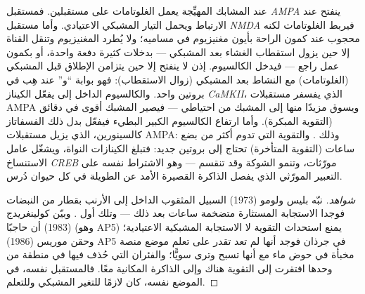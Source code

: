 \begin{proposition}\label{prop:b3:learning-memory:nmda}
عند المشابك المهيِّجة يعمل الغلوتامات على مستقبلين. فمستقبل
\emph{AMPA} ينفتح عند الارتباط ويحمل التيار المشبكي
الاعتيادي. وأما مستقبل \emph{NMDA} فيربط الغلوتامات لكنه
محجوب عند كمون الراحة بأيون مغنيزيوم في مساميه؛ ولا يُطرد
المغنيزيوم وتنقل القناة إلا حين يزول استقطاب الغشاء بعد
المشبكي --- بدخلات كثيرة دفعة واحدة، أو بكمون عمل راجع ---
فيدخل الكالسيوم.  إذن لا ينفتح إلا حين يتزامن
الإطلاق قبل المشبكي (الغلوتامات) مع النشاط بعد المشبكي
(زوال الاستقطاب): فهو بوابة ``و'' عند هِب في بروتين واحد.
والكالسيوم الداخل إلى \emph{} يفعّل الكيناز
\emph{CaMKII}، الذي يفسفر مستقبلات AMPA ويسوق مزيدًا منها
إلى المشبك من احتياطي --- فيصير المشبك أقوى في دقائق
(التقوية المبكرة). وأما ارتفاع الكالسيوم الكبير البطيء
فيفعّل بدل ذلك الفسفاتاز كالسينورين، الذي يزيل مستقبلات
AMPA: وذلك . والتقوية التي تدوم أكثر من
بضع ساعات (التقوية المتأخرة) تحتاج إلى بروتين جديد: فتبلغ
الكينازات النواة، ويشغّل عامل الاستنساخ \emph{CREB}
مورّثات، وتنمو الشوكة وقد تنقسم --- وهو الاشتراط نفسه على
التعبير المورّثي الذي يفصل الذاكرة القصيرة الأمد عن الطويلة
في كل حيوان دُرس.
\end{proposition}

\begin{proof}[شواهد]
نبّه بليس ولومو (1973) السبيل المثقوب الداخل إلى 
الأرنب بقطار من النبضات فوجدا الاستجابة المستثارة متضخمة
ساعات بعد ذلك --- وتلك أول . وبيّن
كولينغريدج (1983) أن حاجبًا  (وهو AP5) يمنع
استحداث التقوية لا الاستجابة المشبكية الاعتيادية؛ وحقن
موريس (1986) AP5 في  جرذان فوجد أنها لم تعد تقدر على
تعلم موضع منصة مخبأة في حوض ماء مع أنها تسبح وترى سويًّا؛
والفئران التي حُذف فيها  في منطقة  من 
وحدها افتقرت إلى التقوية هناك وإلى الذاكرة المكانية معًا.
فالمستقبل نفسه، في الموضع نفسه، كان لازمًا للتغير المشبكي
وللتعلم.
\end{proof}

